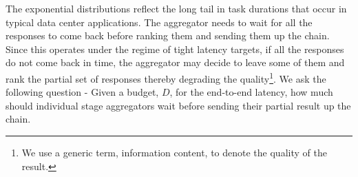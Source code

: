 \documentclass[letterpaper,twocolumn,10pt]{article}
\begin{document}

The exponential distributions reflect the long tail in task durations that occur in typical data center applications. 
The aggregator needs to wait for all the responses to come back before ranking them and sending them up the chain. 
Since this operates under the regime of tight latency targets, if all the responses do not come back in time, the aggregator may decide to leave some of them and rank the partial set of responses thereby degrading the quality\footnote{We use a generic term, information content, to denote the quality of the result. }. We ask the following question - Given a budget, $D$, for the end-to-end latency, how much should individual stage aggregators wait before sending their partial result up the chain.
\end{document}
